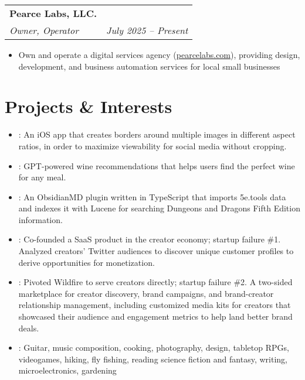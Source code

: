 \documentclass[letterpaper,11pt]{article}
\makeatletter
\newcommand{\resumeHeading}[3]{
  \begin{tabular*}{\textwidth}[t]{l@{\extracolsep{\fill}}r}
    \textbf{#1} & \\
    \color{lighter}\interlight\textit{\small#2} & \color{lighter}\interlight\textit{\small#3} \\
  \end{tabular*}
}
\newcommand{\resumeItemListStart}{
\begin{itemize}[leftmargin=20pt]}
\newcommand{\resumeItemListEnd}{
\end{itemize}}
\makeatother
\begin{document}
\vspace{16pt}
\resumeHeading
{Pearce Labs, LLC.}
{Owner, Operator}{July 2025 -- Present}
\resumeItemListStart
\item Own and operate a digital services agency (\href{https://pearcelabs.com}{pearcelabs.com}), providing design, development, and business automation services for local small businesses
\resumeItemListEnd

\section{Projects \& Interests}
\begin{itemize}[leftmargin=0pt]
  \item[]{\faLink\space \href{https://multiborder.io}{}}: An iOS app that creates borders around multiple images in different aspect ratios, in order to maximize viewability for social media without cropping. \\
  \item[]{\faLink\space \href{https://oeno.chat}{}}: GPT-powered wine recommendations that helps users find the perfect wine for any meal. \\
  \item[]{\faLink\space \href{https://github.com/adamhp/5e-spell-search}{}}: An ObsidianMD plugin written in TypeScript that imports 5e.tools data and indexes it with Lucene for searching Dungeons and Dragons Fifth Edition information.  \\
  \item[]{}: Co-founded a SaaS product in the creator economy; startup failure \#1. Analyzed creators' Twitter audiences to discover unique customer profiles to derive opportunities for monetization. \\
  \item[]{}: Pivoted Wildfire to serve creators directly; startup failure \#2. A two-sided marketplace for creator discovery, brand campaigns, and brand-creator relationship management, including customized media kits for creators that showcased their audience and engagement metrics to help land better brand deals. \\
  \item[]{}{}: Guitar, music composition, cooking, photography, design, tabletop RPGs, videogames, hiking, fly fishing, reading science fiction and fantasy, writing, microelectronics, gardening
\end{itemize}
\end{document}
